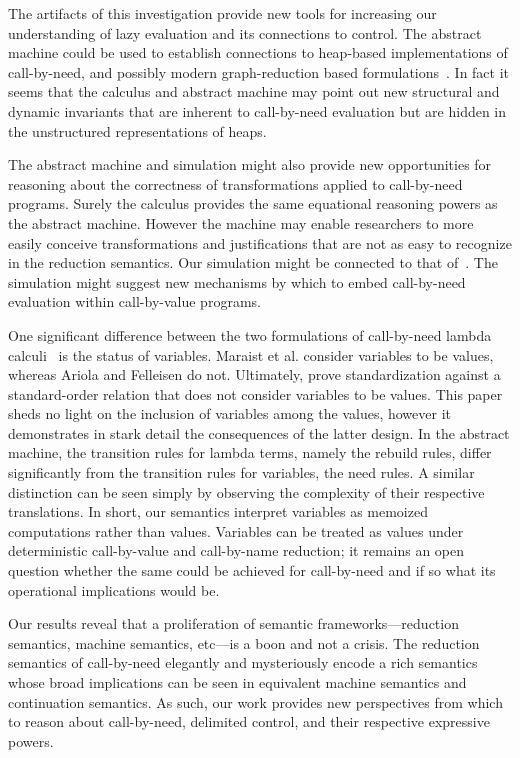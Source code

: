 \documentclass{LMCS}
\theoremstyle{plain}
\theoremstyle{remark}
\begin{document}
The artifacts of this investigation provide new tools for increasing our
understanding of lazy evaluation and its connections to control.  The abstract
machine could be used to establish connections to heap-based implementations of
call-by-need, and possibly modern graph-reduction based
formulations~\cite{peytonjones89spineless}.  In fact it seems that the calculus
and abstract machine may point out new structural and dynamic invariants that
are inherent to call-by-need evaluation but are hidden in the unstructured
representations of heaps.

The abstract machine and simulation might also provide new opportunities for
reasoning about the correctness of transformations applied to call-by-need
programs.  Surely the calculus provides the same equational reasoning powers as
the abstract machine.  However the machine may enable researchers to more
easily conceive transformations and justifications that are not as easy to
recognize in the reduction semantics.  Our simulation might be connected to
that of~\citet{OKASAKI94}.  The simulation might suggest new mechanisms by
which to embed call-by-need evaluation within call-by-value programs.

One significant difference between the two formulations of call-by-need lambda
calculi~\cite{maraist98need,ariola97need} is the status of variables.  Maraist
et al. consider variables to be values, whereas Ariola and Felleisen do not.
Ultimately, \citet{maraist98need} prove standardization against a
standard-order relation that does not consider variables to be values.  This
paper sheds no light on the inclusion of variables among the values, however it
demonstrates in stark detail the consequences of the latter design.  In the
abstract machine, the transition rules for lambda terms, namely the rebuild
rules, differ significantly from the transition rules for variables, the need
rules.  A similar distinction can be seen simply by observing the complexity of
their respective translations.  In short, our semantics interpret variables as
memoized computations rather than values.  Variables can be treated as 
values under deterministic call-by-value and call-by-name reduction; it remains
an open question whether the same could be achieved for call-by-need and if so
what its operational implications would be.


Our results reveal that a proliferation of semantic frameworks---reduction
semantics, machine semantics, etc---is a boon and not a crisis.  The reduction
semantics of call-by-need elegantly and mysteriously encode a rich semantics
whose broad implications can be seen in equivalent machine semantics and
continuation semantics.  As such, our work provides new perspectives from which
to reason about call-by-need, delimited control, and their respective
expressive powers.
\end{document}
